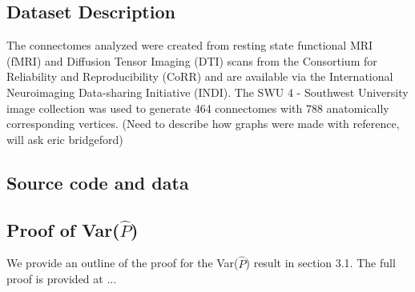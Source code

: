 	\subsection{Dataset Description}
	The connectomes analyzed were created from resting state functional MRI (fMRI) and Diffusion Tensor Imaging (DTI) scans from the Consortium for Reliability and Reproducibility (CoRR) and are available via the International Neuroimaging Data-sharing Initiative (INDI).  The SWU 4 - Southwest University image collection was used to generate 464 connectomes with 788 anatomically corresponding vertices.  (Need to describe how graphs were made with reference, will ask eric bridgeford)
	\subsection{Source code and data}
	\subsection{Proof of Var($\hat{P}$)}
	We provide an outline of the proof for the Var($\hat{P}$) result in section 3.1.  The full proof is provided at ...